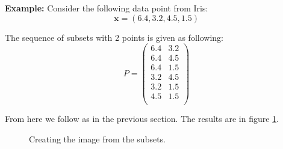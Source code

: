 \documentclass[11pt]{article}
\begin{document}
\textbf{Example:} Consider the following data point from Iris:
\[
\mathbf{x} = (6.4,3.2,4.5,1.5)
\]

The sequence of subsets with 2 points is given as following:
\[
P = 
\left(
\begin{array}{cc}
 6.4 & 3.2 \\
 6.4 & 4.5 \\
 6.4 & 1.5 \\
 3.2 & 4.5 \\
 3.2 & 1.5 \\
 4.5 & 1.5 \\
\end{array}
\right)
\]

From here we follow as in the previous section. The results are in figure \ref{fig:S}.

\begin{figure}[htp]
    \centering
    \qquad
    \caption{Creating the image from the subsets.}
    \label{fig:S}
\end{figure}
\end{document}
